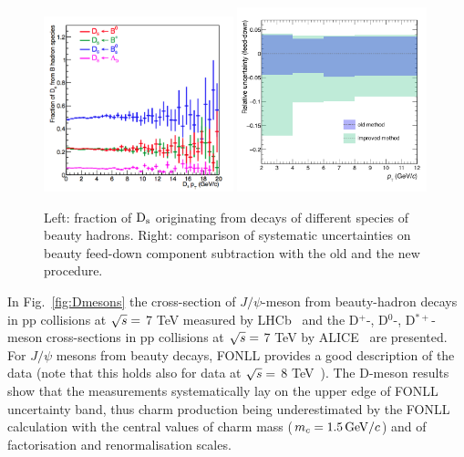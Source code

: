 \begin{figure}[!h]
\begin{center}
\includegraphics[width=0.49\textwidth]{FigCap4/DsParents.png}
\includegraphics[width=0.49\textwidth]{FigCap4/comparisonFDerr_pass2_pass4.png}
\caption{Left: fraction of ${\rm D_s}$ originating from decays of different species of beauty hadrons. Right: comparison of systematic uncertainties on beauty feed-down component subtraction with the old and the new procedure.}
\label{fig:DsParentsAndFDunc}
\end{center}
\end{figure}
In Fig.~\ref{fig:Dmesons} the cross-section 
of $J/\psi$-meson from beauty-hadron decays in pp collisions at 
$\sqrt{s} = $ 7 TeV measured by LHCb~\cite{Aaij:2011jh} and 
the D$^{+}$-, D$^{0}$-, D$^{*+}$-meson cross-sections in pp collisions at $\sqrt{s} = $ 7 TeV by ALICE~\cite{ALICE:2011aa}
are presented. For $J/\psi$ mesons from beauty decays, FONLL provides a good description of 
the data (note that this holds also for data at $\sqrt{s} =$ 8 TeV~\cite{Aaij:2013yaa}). 
The D-meson results show that the measurements 
systematically lay on the upper edge of FONLL uncertainty 
band, thus charm production being underestimated by the FONLL
calculation with the central values of charm mass ($m_c = 1.5 \, \mathrm{GeV}/c$) and
of factorisation and renormalisation scales.\\
